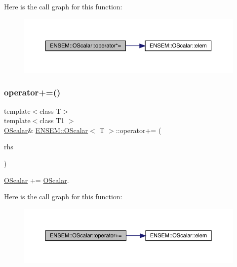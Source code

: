 Here is the call graph for this function\+:
\nopagebreak
\begin{figure}[H]
\begin{center}
\leavevmode
\includegraphics[width=350pt]{da/d80/classENSEM_1_1OScalar_a9977cd15ef5da689d65713ddf0768085_cgraph}
\end{center}
\end{figure}
\mbox{\label{classENSEM_1_1OScalar_a3109a05113cade86410bc77f60812023}} 
\subsubsection{\texorpdfstring{operator+=()}{operator+=()}\hspace{0.1cm}{\footnotesize\ttfamily [1/2]}}
{\footnotesize\ttfamily template$<$class T$>$ \\
template$<$class T1 $>$ \\
\mbox{\hyperlink{classENSEM_1_1OScalar}{O\+Scalar}}\& \mbox{\hyperlink{classENSEM_1_1OScalar}{E\+N\+S\+E\+M\+::\+O\+Scalar}}$<$ T $>$\+::operator+= (\begin{DoxyParamCaption}\item[{const \mbox{\hyperlink{classENSEM_1_1OScalar}{O\+Scalar}}$<$ T1 $>$ \&}]{rhs }\end{DoxyParamCaption})\hspace{0.3cm}{\ttfamily [inline]}}



\mbox{\hyperlink{classENSEM_1_1OScalar}{O\+Scalar}} += \mbox{\hyperlink{classENSEM_1_1OScalar}{O\+Scalar}}. 

Here is the call graph for this function\+:
\nopagebreak
\begin{figure}[H]
\begin{center}
\leavevmode
\includegraphics[width=350pt]{da/d80/classENSEM_1_1OScalar_a3109a05113cade86410bc77f60812023_cgraph}
\end{center}
\end{figure}
\mbox{\label{classENSEM_1_1OScalar_a3109a05113cade86410bc77f60812023}} 

